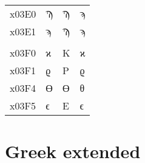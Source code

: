 \documentclass[a4paper]{article}
\newcommand*{\Greek}{\foreignlanguage{greek}}
\newcommand*{\Greek}{\ensuregreek}
\newcommand*{\Cases}[1]{%
  & \Greek{#1} & \Greek{\MakeUppercase{#1}} & \Greek{\MakeLowercase{#1}}
}
\begin{document}
\begin{longtable}{llll}
  x03E0 \Cases{ Ϡ  \Sampi{}                                                   } \\
  x03E1 \Cases{ ϡ  \sampi{}                                                   } \\
                                                                                \\
  x03F0 \Cases{ ϰ  \kappasymbol                                               } \\
  x03F1 \Cases{ ϱ  \rhosymbol                                                 } \\
  x03F4 \Cases{ ϴ  \Thetasymbol                                               } \\
  x03F5 \Cases{ ϵ  \epsilonsymbol } \\
\end{longtable}


\section{Greek extended}
\end{document}
